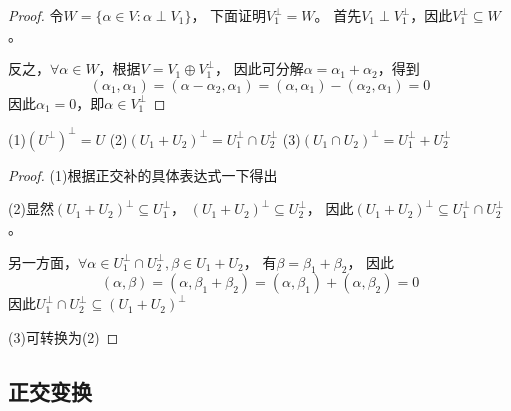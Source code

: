 \begin{proof}
  令$W = \{\alpha \in V: \alpha \perp V_1\}$，
  下面证明$V_1^{\perp} = W$。
  首先$V_1 \perp V_1^{\perp}$，因此$V_1^{\perp} \subseteq W$。

  反之，$\forall \alpha \in W$，根据$V = V_1 \oplus V_1^{\perp}$，
  因此可分解$\alpha = \alpha_1 + \alpha_2$，得到
  \begin{equation*}
    (\alpha_1,\alpha_1) = (\alpha - \alpha_2, \alpha_1) = (\alpha,\alpha_1) - (\alpha_2,\alpha_1) = 0
  \end{equation*}
  因此$\alpha_1 = 0$，即$\alpha \in V_1^{\perp}$
\end{proof}

\begin{theorem}[正交补的性质]
  (1)$(U^{\perp})^{\perp} = U$
  (2)$(U_1 + U_2)^{\perp} = U_1^{\perp} \cap U_2^{\perp}$
  (3)$(U_1 \cap U_2)^{\perp} = U_1^{\perp} + U_2^{\perp}$
\end{theorem}

\begin{proof}
  (1)根据正交补的具体表达式一下得出

  (2)显然$(U_1 + U_2)^{\perp} \subseteq U_1^{\perp}$，
  $(U_1 + U_2)^{\perp} \subseteq U_2^{\perp}$，
  因此$(U_1 + U_2)^{\perp} \subseteq U_1^{\perp} \cap U_2^{\perp}$。

  另一方面，$\forall \alpha \in U_1^{\perp} \cap U_2^{\perp}, \beta \in U_1 + U_2$，
  有$\beta = \beta_1 + \beta_2$，
  因此
  \begin{equation*}
    (\alpha,\beta) = (\alpha, \beta_1 + \beta_2) = (\alpha, \beta_1) + (\alpha, \beta_2) = 0
  \end{equation*}
  因此$U_1^{\perp} \cap U_2^{\perp} \subseteq (U_1+U_2)^{\perp}$
  
  (3)可转换为(2)

\end{proof}

\subsection{正交变换}


